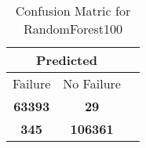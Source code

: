 \begin{table}[] 
\caption{Confusion Matric for RandomForest100} 
\label{Table: Prediction Accuracy-DMDRandomForest100100.0EKF-ignoresolarPanelDipole-solarPanelDipole} 
\centering 
\begin{tabular} 
 {@{}ccc@{}} 
\toprule 
\multicolumn{2}{c}{\textbf{Predicted}}
 \\ \midrule 
\multicolumn{1}{|c|}{Failure} & 
\multicolumn{1}{c|}{No Failure}
 \\ \midrule 
\multicolumn{1}{|c|}{\color{green}\textbf{63393}} & 
\multicolumn{1}{c|}{\color{red}\textbf{29}}
 \\ \midrule 
\multicolumn{1}{|c|}{\color{red}\textbf{345}} & 
\multicolumn{1}{c|}{\color{green}\textbf{106361}}
 \\ \bottomrule 
\end{tabular} 
\end{table} 
